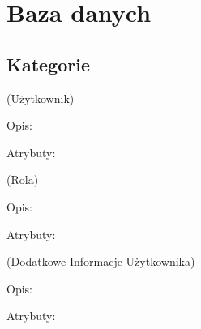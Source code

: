 \section{Baza danych}

\subsection{Kategorie}

\begin{enumerate}[label={\textbf{KAT/\protect\threedigits{\theenumi}}}, wide, labelwidth=!, labelindent=0pt, labelsep=0pt, series=reqs]
    \setlength\itemsep{1em}
     \label{kat:user} (Użytkownik)

    Opis: \lipsum[1]
    \par
    Atrybuty:
    \begin{itemize}[series=atr]
         \label{kat:user:id}
         \label{kat:user:login}
         \label{kat:user:passwordHash}
         \label{kat:user:firstName}
         \label{kat:user:lastName}
         \label{kat:user:email}
         \label{kat:user:image}
         \label{kat:user:activated}
         \label{kat:user:langKey}
         \label{kat:user:activationKey}
         \label{kat:user:createdBy}
         \label{kat:user:createdDate}
         \label{kat:user:resetDate}
         \label{kat:user:lastModifiedBy}
         \label{kat:user:lastModifiedDate}
    \end{itemize}

     \label{kat:authority} (Rola)

    Opis: \lipsum[1]
    \par
    Atrybuty:
    \begin{itemize}[series=atr]
         \label{kat:authority:name}
    \end{itemize}

     \label{kat:UserExtraInfo} (Dodatkowe Informacje Użytkownika)

    Opis: \lipsum[1]
    \par
    Atrybuty:
    \begin{itemize}[series=atr]
         \label{kat:UserExtraInfo:id}
         \label{kat:UserExtraInfo:gender}
         \label{kat:UserExtraInfo:dateOfBirth}
         \label{kat:UserExtraInfo:phoneNumber}
         \label{kat:UserExtraInfo:streetAddress}
         \label{kat:UserExtraInfo:postalCode}
         \label{kat:UserExtraInfo:city}
         \label{kat:UserExtraInfo:country}
         \label{kat:UserExtraInfo:personalDescription}
    \end{itemize}


\end{enumerate}

